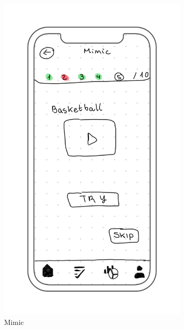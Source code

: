 \begin{figure}[H]
    \centering
    \begin{subfigure}[T]{0.24\textwidth}
        \centering
        \includegraphics[width=\textwidth]{assets/screens/quiz/Quiz - Mimic.png}
        \caption{Mimic}
        \label{fig:design_screen_mimic}
    \end{subfigure}
    \hfill
    \begin{subfigure}[T]{0.24\textwidth}
        \centering

\end{subfigure}
\end{figure}

